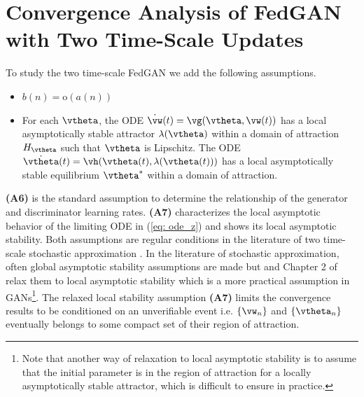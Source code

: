 \documentclass{article}
\begin{document}
\section {Convergence Analysis of FedGAN with Two Time-Scale Updates} \label{app: two_time}
To study the two time-scale FedGAN we add the following assumptions.
	\begin{itemize}
		\item [(\textbf{A6})]  $b(n)=\text{o}(a(n))$
		\item [(\textbf{A7})]  For each ${\vtheta}$, the ODE $\dot{{\vw}}(t)={\vg}({\vtheta}, {\vw}(t))$ has a  local asymptotically stable attractor ${\lambda}({\vtheta})$ within a domain of attraction $H_\vtheta$ such that ${\vtheta}$ is Lipschitz. The ODE $\dot{{\vtheta}}(t)=\vh({\vtheta}(t),{\lambda}({\vtheta}(t)))$ has a local asymptotically stable equilibrium ${\vtheta^*}$ within a domain of attraction.
	\end{itemize}
	\textbf{(A6)} is the standard assumption to determine the relationship of the generator and discriminator learning rates. \textbf{(A7)} characterizes the local asymptotic behavior of the limiting ODE in (\ref{eq: ode_z}) and shows its local asymptotic stability.
	Both assumptions are regular conditions in the literature of two time-scale stochastic approximation \citep{borkar2009stochastic,karmakar2017two}. 
    In the literature of stochastic approximation, often global asymptotic stability assumptions are made but \citep{karmakar2017two} and Chapter 2 of \citep{borkar2009stochastic} relax them to local asymptotic stability which is a more practical assumption in GANs\footnote{Note that another way of relaxation to local asymptotic stability is to assume that the initial parameter is in the region of attraction for a locally asymptotically stable attractor, which is difficult to ensure in practice.}. The relaxed local stability assumption \textbf{(A7)} limits the convergence results to be conditioned on an unverifiable event i.e. $\{\vw_n\}$ and $\{\vtheta_n\}$ eventually belongs to some compact set of their region of attraction.
\end{document}
